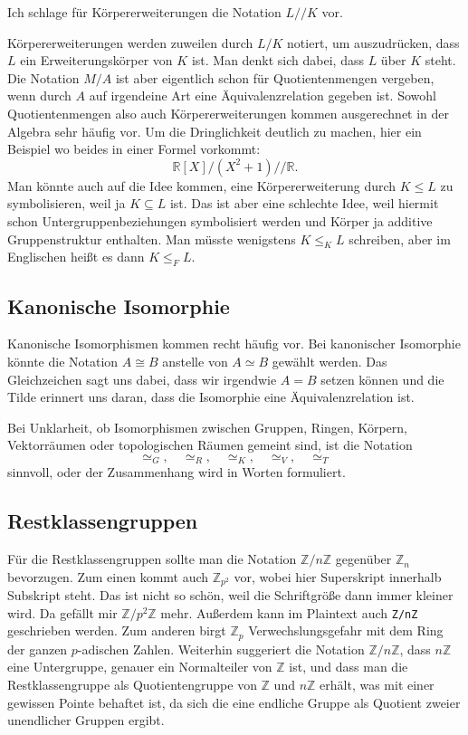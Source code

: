 \documentclass[a4paper,11pt,fleqn,twoside,BCOR=16mm]{scrartcl}
\newcommand{\Z}{\mathbb Z}
\begin{document}
Ich schlage für Körpererweiterungen die Notation $L/\!/K$
vor.

Körpererweiterungen werden zuweilen durch $L/K$ notiert, um
auszudrücken, dass $L$ ein Erweiterungskörper von $K$ ist.
Man denkt sich dabei, dass $L$ über $K$ steht. Die Notation
$M/A$ ist aber eigentlich schon für Quotientenmengen vergeben,
wenn durch $A$ auf irgendeine Art eine Äquivalenzrelation
gegeben ist. Sowohl Quotientenmengen also auch Körpererweiterungen
kommen ausgerechnet in der Algebra sehr häufig vor.
Um die Dringlichkeit deutlich zu machen, hier ein Beispiel
wo beides in einer Formel vorkommt:
\begin{equation}
\mathbb R[X]/(X^2+1)/\!/\mathbb R.
\end{equation}
Man könnte auch auf die Idee kommen, eine Körpererweiterung
durch $K\le L$ zu symbolisieren, weil ja $K\subseteq L$ ist.
Das ist aber eine schlechte Idee, weil hiermit schon
Untergruppenbeziehungen symbolisiert werden und Körper ja
additive Gruppenstruktur enthalten. Man müsste wenigstens
$K\le_K L$ schreiben, aber im Englischen heißt es dann $K\le_F L$.

\subsection{Kanonische Isomorphie}
Kanonische Isomorphismen kommen recht häufig vor.
Bei kanonischer Isomorphie könnte die Notation $A\cong B$
anstelle von $A\simeq B$ gewählt werden. Das Gleichzeichen sagt
uns dabei, dass wir irgendwie $A=B$ setzen können und die Tilde
erinnert uns daran, dass die Isomorphie eine Äquivalenzrelation
ist.

Bei Unklarheit, ob Isomorphismen zwischen Gruppen, Ringen, Körpern,
Vektorräumen oder topologischen Räumen gemeint sind, ist die
Notation
\begin{equation}
\simeq_G,\quad\simeq_R,\quad\simeq_K,\quad\simeq_V,\quad\simeq_T
\end{equation}
sinnvoll, oder der Zusammenhang wird in Worten formuliert.

\subsection{Restklassengruppen}
Für die Restklassengruppen sollte man die Notation $\Z/n\Z$
gegenüber $\Z_n$ bevorzugen. Zum einen kommt auch $\Z_{p^2}$
vor, wobei hier Superskript innerhalb Subskript steht.
Das ist nicht so schön, weil die Schriftgröße dann immer kleiner
wird. Da gefällt mir $\Z/p^2\Z$ mehr. Außerdem kann im Plaintext
auch \verb|Z/nZ| geschrieben werden. Zum anderen birgt $\Z_p$
Verwechslungsgefahr mit dem Ring der ganzen $p$-adischen Zahlen.
Weiterhin suggeriert die
Notation $\Z/n\Z$, dass $n\Z$ eine Untergruppe, genauer ein
Normalteiler von $\Z$ ist, und dass man die Restklassengruppe
als Quotientengruppe von $\Z$ und $n\Z$ erhält, was mit einer
gewissen Pointe behaftet ist, da sich die eine endliche Gruppe
als Quotient zweier unendlicher Gruppen ergibt.
\end{document}
